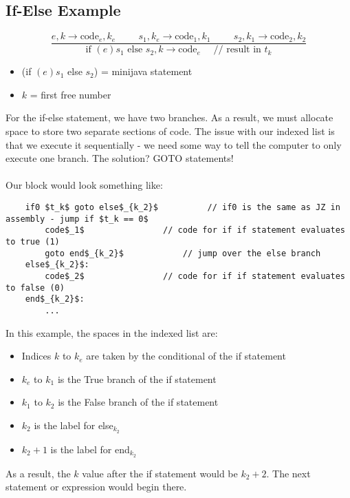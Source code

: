 \documentclass[10pt]{article}
\begin{document}
\subsection*{If-Else Example}
\[\frac{e, k \rightarrow \text{code}_e, k_e \hspace{1cm} s_1, k_e \rightarrow \text{code}_1, k_1 \hspace{1cm} s_2, k_1 \rightarrow \text{code}_2, k_2}{\text{if }(e) s_1 \text{ else } s_2, k \rightarrow \text{code}_e \text{~~~~// result in $t_k$}}\]
\begin{itemize}
    \item (if $(e) s_1$ else $s_2$) = minijava statement
    \item $k$ = first free number
\end{itemize}
For the if-else statement, we have two branches.  As a result, we must allocate space to store two separate sections of code.  The issue with our indexed list is that we execute it sequentially - we need some way to tell the computer to only execute one branch.  The solution?  GOTO statements!\\\\
Our block would look something like:
\begin{lstlisting}
    if0 $t_k$ goto else$_{k_2}$          // if0 is the same as JZ in assembly - jump if $t_k == 0$
        code$_1$                // code for if if statement evaluates to true (1)
        goto end$_{k_2}$            // jump over the else branch
    else$_{k_2}$:
        code$_2$                // code for if if statement evaluates to false (0)
    end$_{k_2}$: 
        ...

\end{lstlisting}
In this example, the spaces in the indexed list are:
\begin{itemize}
    \item Indices $k$ to $k_e$ are taken by the conditional of the if statement
    \item $k_e$ to $k_1$ is the True branch of the if statement
    \item $k_1$ to $k_2$ is the False branch of the if statement
    \item $k_2$ is the label for else$_{k_2}$
    \item $k_2 + 1$ is the label for end$_{k_2}$
\end{itemize}
As a result, the $k$ value after the if statement would be $k_2 + 2$.  The next statement or expression would begin there.
\end{document}
